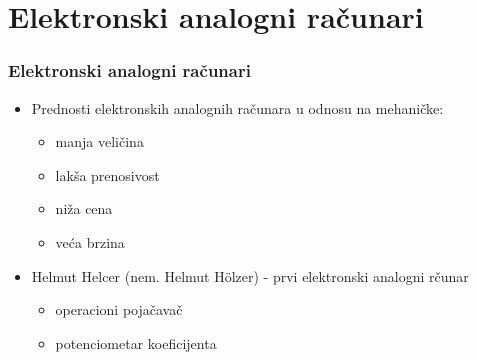 \documentclass[14pt]{beamer}
\begin{document}
\section{Elektronski analogni računari}
\begin{frame}[fragile]\frametitle{Elektronski analogni računari}
	\begin{itemize}
		\item Prednosti elektronskih analognih računara u odnosu na mehaničke:
		\begin{itemize}
			\item manja veličina
			\item lakša prenosivost
			\item niža cena
			\item  veća brzina
		\end{itemize}
	\end{itemize}
\begin{itemize}
	\item Helmut Helcer (nem. Helmut Hölzer) - prvi elektronski analogni rčunar
	\begin{itemize}
		\item operacioni pojačavač
		\item potenciometar koeficijenta
	\end{itemize}
\end{itemize}
\end{frame}
\end{document}
